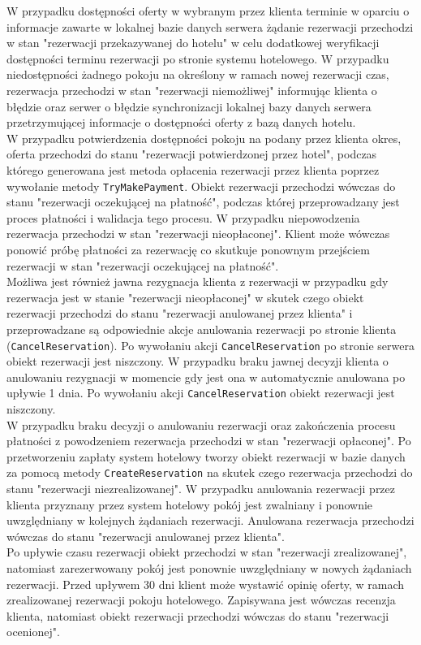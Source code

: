 \documentclass{article}
\begin{document}
\indent W przypadku dostępności oferty w wybranym przez klienta terminie w oparciu o informacje zawarte w lokalnej bazie danych serwera żądanie rezerwacji przechodzi w stan "rezerwacji przekazy\-wanej do hotelu" w celu dodatkowej weryfikacji dostępności terminu rezerwacji po stronie systemu hotelowego. W przypadku niedostępności żadnego pokoju na określony w ramach nowej rezerwacji czas, rezerwacja przechodzi w stan "rezerwacji niemożliwej" informując klienta o błędzie oraz serwer o błędzie synchronizacji lokalnej bazy danych serwera przetrzymującej informacje o dostępności oferty z bazą danych hotelu.\\
\indent W przypadku potwierdzenia dostępności pokoju na podany przez klienta okres, oferta przechodzi do stanu "rezerwacji potwierdzonej przez hotel", podczas którego generowana jest metoda opłacenia rezerwacji przez klienta poprzez wywołanie metody \texttt{TryMakePayment}. Obiekt rezerwacji przechodzi wówczas do stanu "rezerwacji oczekującej na płatność", podczas której przeprowadzany jest proces płatności i walidacja tego procesu. W przypadku niepowodzenia rezerwacja przechodzi w stan "rezerwacji nieopłaconej". Klient może wówczas ponowić próbę płatności za rezerwację co skutkuje ponownym przejściem rezerwacji w stan "rezerwacji oczekującej na płatność".\\
\indent Możliwa jest również jawna rezygnacja klienta z rezerwacji w przypadku gdy rezerwacja jest w stanie "rezerwacji nieopłaconej" w skutek czego obiekt rezerwacji przechodzi do stanu "rezerwacji anulowanej przez klienta" i przeprowadzane są odpowiednie akcje anulowania rezerwacji po stronie klienta (\texttt{CancelReservation}). Po wywołaniu akcji \texttt{CancelReservation} po stronie serwera obiekt rezerwacji jest niszczony. W przypadku braku jawnej decyzji klienta o anulowaniu rezygnacji w momencie gdy jest ona w automatycznie anulowana po upływie 1 dnia. Po wywołaniu akcji \texttt{CancelRe\-servation} obiekt rezerwacji jest niszczony.\\
\indent W przypadku braku decyzji o anulowaniu rezerwacji oraz zakończenia procesu płatności z powo\-dzeniem rezerwacja przechodzi w stan "rezerwacji opłaconej". Po przetworzeniu zapłaty system hotelowy tworzy obiekt rezerwacji w bazie danych za pomocą metody \texttt{CreateReservation} na skutek czego rezerwacja przechodzi do stanu "rezerwacji niezrealizowanej". W przypadku anulowania rezerwacji przez klienta przyznany przez system hotelowy pokój jest zwalniany i ponownie uwzględniany w kolejnych żądaniach rezerwacji. Anulowana rezerwacja przechodzi wówczas do stanu "rezerwacji anulowanej przez klienta".\\
\indent Po upływie czasu rezerwacji obiekt przechodzi w stan "rezerwacji zrealizowanej", natomiast zarezerwowany pokój jest ponownie uwzględniany w nowych żądaniach rezerwacji. Przed upływem 30 dni klient może wystawić opinię oferty, w ramach zrealizowanej rezerwacji pokoju hotelowego. Zapisywana jest wówczas recenzja klienta, natomiast obiekt rezerwacji przechodzi wówczas do stanu "rezerwacji ocenionej".
\end{document}
